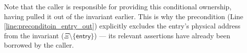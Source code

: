 Note that the caller is responsible for providing this conditional ownership, having pulled it out of the invariant earlier.
This is why the precondition (Line \ref{line:preconditoin_entry_out}) explicitly excludes the entry's physical address from the invariant ($\Xi\setminus\{\mathsf{entry}\}$) ---
its relevant assertions have already been borrowed by the caller.
\\



